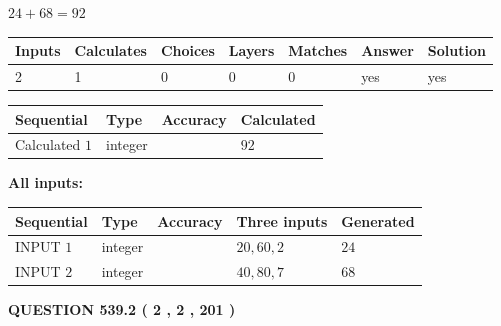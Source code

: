 \documentclass[12pt]{article}
\begin{document}
 

$ %
24 +  %
68=   %
92$
 
 
\noindent{}
 
 

 
   
   
   
   
\noindent\begin{tabular}{|l|l|l|l|l|l|l|}
 \hline
Inputs & Calculates & Choices & Layers & Matches & Answer & Solution \\ \hline
 2  & 
 1  & 
 0
  & 
 0  & 
 0  & 
  yes & 
  yes 
  \\ \hline
 \end{tabular}
   
   
   
   
\noindent{}
   
   
  
  
\noindent\begin{tabular}{|l|l|l|l|}
\hline
 Sequential & Type & Accuracy & Calculated \\ 
\hline
 
 
  Calculated $  1 $ & integer &  & 
  $ 92 $ 
 \\  \hline  
 \end{tabular}
   
   
   
   
\noindent\vspace{0.1in}\hspace{-0.08in} {\textbf{\Large{All inputs: }}}
   
   
  
  
\noindent\begin{tabular}{|l|l|l|l|l|}
\hline
 Sequential & Type & Accuracy & Three inputs & Generated \\ 
\hline
 
 
  INPUT $  1 $ & integer &  & $
 20
 , 
 60
 , 
 2
 $ & $ 24 $ 
 \\  \hline  
 
 
  INPUT $  2 $ & integer &  & $
 40
 , 
 80
 , 
 7
 $ & $ 68 $ 
 \\  \hline  
 \end{tabular}
   
   
  
\vspace{0.2in}
  
{\textbf{\Large{QUESTION
539.2 
 ( 2 , 2 , 201 )
}}}
  
\end{document}
